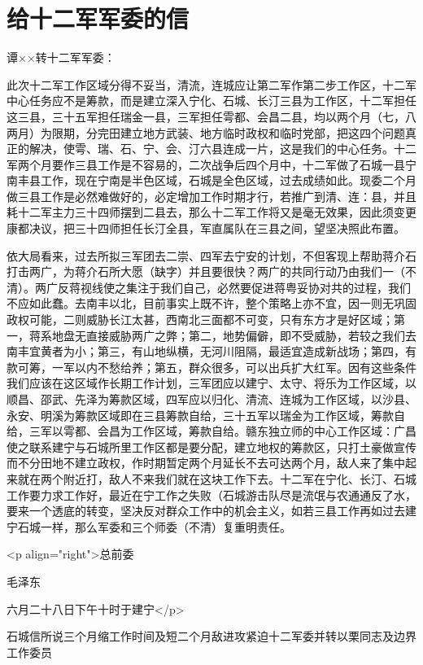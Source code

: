 \section[给十二军军委的信（一九四六年六月二十八日）]{给十二军军委的信}


谭××转十二军军委：

此次十二军工作区域分得不妥当，清流，连城应让第二军作第二步工作区，十二军中心任务应不是筹款，而是建立深入宁化、石城、长汀三县为工作区，十二军担任这三县，三十五军担任瑞金一县，三军担任雩都、会昌二县，均以两个月（七，八两月）为限期，分完田建立地方武装、地方临时政权和临时党部，把这四个问题真正的解决，使雩、瑞、石、宁、会、汀六县连成一片，这是我们的中心任务。十二军两个月要作三县工作是不容易的，二次战争后四个月中，十二军做了石城一县宁南丰县工作，现在宁南是半色区域，石城是全色区域，过去成绩如此。现委二个月做三县工作是必然难做好的，必定增加工作时期才行，若推广到清、连：县，并且耗十二军主力三十四师摆到二县去，那么十二军工作将又是毫无效果，因此须变更康都决议，把三十四师担任长汀全县，军直属队在三县之间，望坚决照此布置。

依大局看来，过去所拟三军团去二崇、四军去宁安的计划，不但客现上帮助蒋介石打击两广，为蒋介石所大愿（缺字）并且要很快？两广的共同行动乃由我们一（不清）。两广反蒋视线使之集注于我们自己，必然要促进蒋粤妥协对共的过程，我们不应如此蠢。去南丰以北，目前事实上既不许，整个策略上亦不宜，因一则无巩固政权可能，二则威胁长江太甚，西南北三面都不可变，只有东方才是好区域；第一，蒋系地盘无直接威胁两广之弊；第二，地势偏僻，即不受威胁，若较之我们去南丰宜黄者为小；第三，有山地纵横，无河川阻隔，最适宜造成新战场；第四，有款可筹，一军以内不愁给养；第五，群众很多，可以出兵扩大红军。因有这些条件我们应该在这区域作长期工作计划，三军团应以建宁、太守、将乐为工作区域，以顺昌、邵武、先泽为筹款区域，四军应以归化、清流、连城为工作区域，以沙县、永安、明溪为筹款区域即在三县筹款自给，三十五军以瑞金为工作区域，筹款自给，三军以雩都、会昌为工作区域，筹款自给。赣东独立师的中心工作区域：广昌使之联系建宁与石城所里工作区都是要分配，建立地权的筹款区，只打土豪做宣传而不分田地不建立政权，作时期暂定两个月延长不去可达两个月，敌人来了集中起来就在两个附近打，敌人不来我们就在这块工作下去。十二军在宁化、长汀、石城工作要力求工作好，最近在宁工作之失败（石城游击队尽是流氓与农通通反了水，要来一个透底的转变，坚决反对群众工作中的机会主义，如若三县工作再如过去建宁石城一样，那么军委和三个师委（不清）复重明责任。

<p align="right">总前委

毛泽东

六月二十八日下午十时于建宁</p>

石城信所说三个月缩工作时间及短二个月敌进攻紧迫十二军委并转以栗同志及边界工作委员

